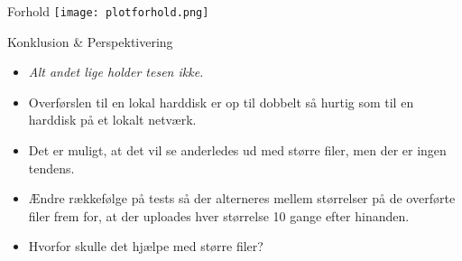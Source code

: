 \documentclass{beamer}
\begin{document}
\begin{frame}{Forhold}
\texttt{[image: plotforhold.png]}
\end{frame}

\begin{frame}{Konklusion \& Perspektivering}
\begin{itemize}
\item \textit{ Alt andet lige holder tesen ikke.}
\item Overførslen til en lokal harddisk er op til dobbelt så hurtig som til en harddisk på et lokalt netværk.
\item Det er muligt, at det vil se anderledes ud med større filer, men der er ingen tendens.
\item Ændre rækkefølge på tests så der alterneres mellem størrelser på de overførte filer frem for, at der uploades hver størrelse 10 gange efter hinanden.
\item Hvorfor skulle det hjælpe med større filer?
\end{itemize}
\end{frame}
\end{document}
